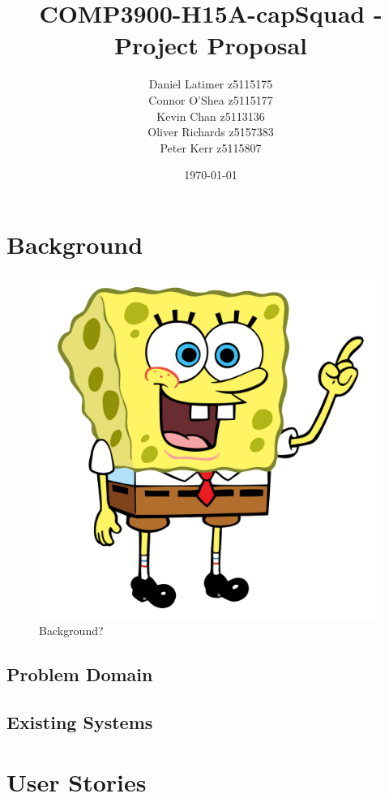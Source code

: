 \documentclass[12pt]{article}
\title{COMP3900-H15A-capSquad - Project Proposal}
\date{\today}
\author{Daniel Latimer z5115175 \\ Connor O'Shea z5115177 \\ Kevin Chan z5113136 \\ Oliver Richards z5157383 \\ Peter Kerr z5115807}
\begin{document}
\maketitle
\tableofcontents
\newpage

\section{Background}

\begin{figure}
    \includegraphics[width=\textwidth]{resources/spongebob}
    \caption{Background? \cite{Laird2012}}
    \label{fig:background}
\end{figure} 

\subsection{Problem Domain}
\subsection{Existing Systems}

\section{User Stories}
\end{document}
